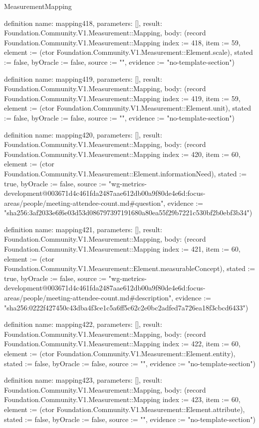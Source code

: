 \begin{lexlean}{MeasurementMapping}
\begin{semanticmodule}
definition{
  name: mapping418,
  parameters: [],
  result: Foundation.Community.V1.Measurement::Mapping,
  body: (record Foundation.Community.V1.Measurement::Mapping {index := 418, item := 59, element := (ctor Foundation.Community.V1.Measurement::Element.scale), stated := false, byOracle := false, source := "", evidence := "no-template-section"})
}

definition{
  name: mapping419,
  parameters: [],
  result: Foundation.Community.V1.Measurement::Mapping,
  body: (record Foundation.Community.V1.Measurement::Mapping {index := 419, item := 59, element := (ctor Foundation.Community.V1.Measurement::Element.unit), stated := false, byOracle := false, source := "", evidence := "no-template-section"})
}

definition{
  name: mapping420,
  parameters: [],
  result: Foundation.Community.V1.Measurement::Mapping,
  body: (record Foundation.Community.V1.Measurement::Mapping {index := 420, item := 60, element := (ctor Foundation.Community.V1.Measurement::Element.informationNeed), stated := true, byOracle := false, source := "wg-metrics-development@003671d4c461fda2487aae612db00a9f80de4e6d:focus-areas/people/meeting-attendee-count.md#question", evidence := "sha256:3af2033e6f6e03d53d086797397191680a80ea55f29b7221c530bf2b0ebf3b34"})
}

definition{
  name: mapping421,
  parameters: [],
  result: Foundation.Community.V1.Measurement::Mapping,
  body: (record Foundation.Community.V1.Measurement::Mapping {index := 421, item := 60, element := (ctor Foundation.Community.V1.Measurement::Element.measurableConcept), stated := true, byOracle := false, source := "wg-metrics-development@003671d4c461fda2487aae612db00a9f80de4e6d:focus-areas/people/meeting-attendee-count.md#description", evidence := "sha256:0222f427450c43dba4f3ce1c5a6ff5c62c2e0bc2adfed7a726ea18f3cbcd6433"})
}

definition{
  name: mapping422,
  parameters: [],
  result: Foundation.Community.V1.Measurement::Mapping,
  body: (record Foundation.Community.V1.Measurement::Mapping {index := 422, item := 60, element := (ctor Foundation.Community.V1.Measurement::Element.entity), stated := false, byOracle := false, source := "", evidence := "no-template-section"})
}

definition{
  name: mapping423,
  parameters: [],
  result: Foundation.Community.V1.Measurement::Mapping,
  body: (record Foundation.Community.V1.Measurement::Mapping {index := 423, item := 60, element := (ctor Foundation.Community.V1.Measurement::Element.attribute), stated := false, byOracle := false, source := "", evidence := "no-template-section"})
}


\end{semanticmodule}
\end{lexlean}
